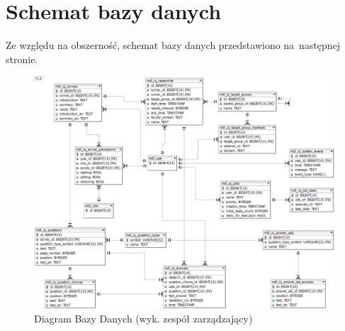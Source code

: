 \section{Schemat bazy danych}
\label{Chapter56}

Ze względu na obszerność, schemat bazy danych przedstawiono na~następnej stronie.

\newpage
\begin{figure}[th]
\centering\includegraphics[angle=90,height=1.3\textwidth]{figures/iQuest_Database}
\caption{Diagram Bazy Danych (wyk. zespół zarządzający)}\label{rys:iQuest_DataBase}
\end{figure}